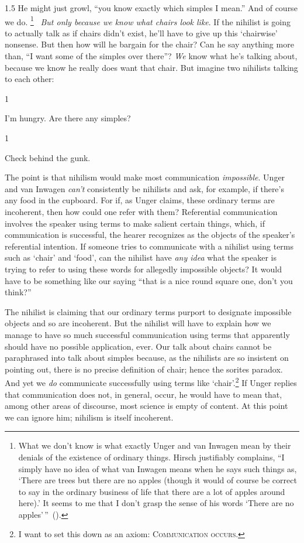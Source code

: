 \documentclass[11pt]{article}
\newcommand{\stage}[3]%
{%
	\begin{spacing}{1}%
	\vspace{0pt}
		\begin{description}[style=nextline, parsep=0pt, leftmargin=15mm, itemindent=-10mm, font=\mdseries]
			\item[\textsc{#1} \emph{#2}] #3
		\end{description}%
	\end{spacing}%
}
\begin{document}
\begin{spacing}{1.5}
He might just growl, ``you know exactly which simples I mean.'' And of course we do.%
%
\footnote{What we don't know is what exactly Unger and van Inwagen mean by their denials of the existence of ordinary things. Hirsch justifiably complains, ``I simply have no idea of what van Inwagen means when he says such things as, `There are trees but there are no apples (though it would of course be correct to say in the ordinary business of life that there are a lot of apples around here).' It seems to me that I don't grasp the sense of his words `There are no apples'\,''~(\citeyear[690]{hirsch1993}).}%
%
\ {\em But only because we know what chairs look like}. If the nihilist is going to actually talk as if chairs didn't exist, he'll have to give up this `chairwise' nonsense. But then how will he bargain for the chair? Can he say anything more than, ``I want some of the simples over there''? {\em We} know what he's talking about, because we know he really does want that chair. But imagine two nihilists talking to each other:

\stage{Unger}{}{I'm hungry. Are there any simples?}
\stage{van Inwagen}{}{Check behind the gunk.}

The point is that nihilism would make most communication {\em impossible}. Unger and van Inwagen {\em can't} consistently be nihilists and ask, for example, if there's any food in the cupboard. For if, as Unger claims, these ordinary terms are incoherent, then how could one refer with them? Referential communication involves the speaker using terms to make salient certain things, which, if communication is successful, the hearer recognizes as the objects of the speaker's referential intention. If someone tries to communicate with a nihilist using terms such as `chair' and `food', can the nihilist have {\em any idea} what the speaker is trying to refer to using these words for allegedly impossible objects? It would have to be something like our saying ``that is a nice round square one, don't you think?''%
%

The nihilist is claiming that our ordinary terms purport to designate impossible objects and so are incoherent. But the nihilist will have to explain how we manage to have so much successful communication using terms that apparently should have no possible application, ever. Our talk about chairs cannot be paraphrased into talk about simples because, as the nihilists are so insistent on pointing out, there is no precise definition of chair; hence the sorites paradox. And yet we {\em do} communicate successfully using terms like `chair'.\footnote{I want to set this down as an axiom: \textsc{Communication occurs.}} If Unger replies that communication does not, in general, occur, he would have to mean that, among other areas of discourse, most science is empty of content. At this point we can ignore him; nihilism is itself incoherent.


\end{spacing}
\end{document}
